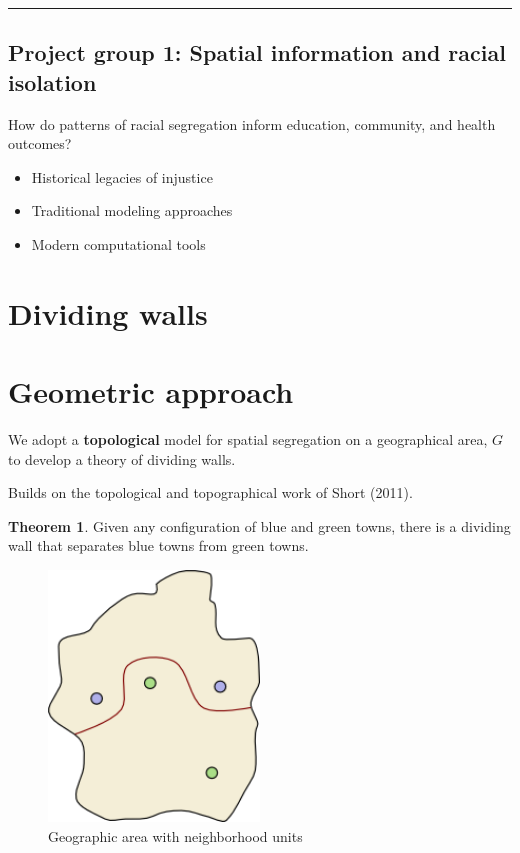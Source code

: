\documentclass[
  letterpaper,
  DIV=11,
  numbers=noendperiod]{scrartcl}
\begin{document}
\begin{center}\rule{0.5\linewidth}{0.5pt}\end{center}

\hypertarget{project-group-1-spatial-information-and-racial-isolation}{%
\subsection{Project group 1: Spatial information and racial
isolation}\label{project-group-1-spatial-information-and-racial-isolation}}

How do patterns of racial segregation inform education, community, and
health outcomes?

\begin{itemize}
\item
  Historical legacies of injustice
\item
  Traditional modeling approaches
\item
  Modern computational tools
\end{itemize}

\hypertarget{dividing-walls}{%
\section{Dividing walls}\label{dividing-walls}}

\hypertarget{geometric-approach}{%
\section{Geometric approach}\label{geometric-approach}}

We adopt a \textbf{topological} model for spatial segregation on a
geographical area, \(G\) to develop a theory of dividing walls.

Builds on the topological and topographical work of Short (2011).

\textbf{Theorem 1}. Given any configuration of blue and green towns,
there is a dividing wall that separates blue towns from green towns.

\begin{figure}

{\centering \includegraphics[width=0.5\textwidth,height=\textheight]{wall-2.png}

}

\caption{Geographic area with neighborhood units}

\end{figure}
\end{document}
